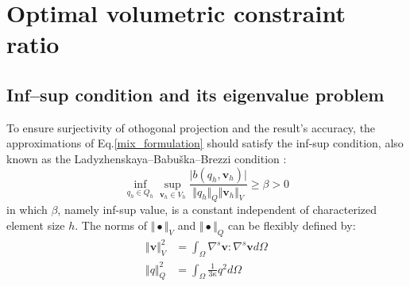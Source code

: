 \section{Optimal volumetric constraint ratio}\label{sec:constraint_ratio}
\subsection{Inf--sup condition and its eigenvalue problem}

To ensure surjectivity of othogonal projection and the result's accuracy, the approximations of Eq.\eqref{mix_formulation} should satisfy the inf-sup condition, also known as the Ladyzhenskaya–Babuška–Brezzi condition \cite{bathe1996}:
\begin{equation}\label{infsup}
    \inf_{q_h \in Q_h} \sup_{\boldsymbol v_h \in V_h} \frac{\vert b(q_h,\boldsymbol v_h) \vert}{\Vert q_h \Vert_Q \Vert \boldsymbol v_h \Vert_V} \ge \beta > 0
\end{equation}
in which $\beta$, namely inf-sup value, is a constant independent of characterized element size $h$.
The norms of $\Vert \bullet \Vert_V$ and $\Vert \bullet \Vert_Q$ can be flexibly defined by:
\begin{align}
    \label{norm_V}
    \Vert \boldsymbol v\Vert_V^2 &= \int_\Omega \nabla^s \boldsymbol v : \nabla^s \boldsymbol v d\Omega \\
    \label{norm_Q}
    \Vert q \Vert_Q^2 &= \int_\Omega \frac{1}{3\kappa}q^2 d\Omega
\end{align}


